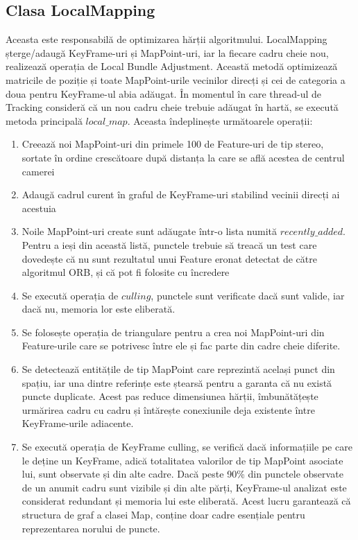\documentclass[12pt,a4paper]{report}
\begin{document}
\subsection{Clasa LocalMapping}
Aceasta este responsabilă de optimizarea hărții algoritmului. LocalMapping șterge/adaugă KeyFrame-uri
și MapPoint-uri, iar la fiecare cadru cheie nou, realizează operația de Local Bundle 
Adjustment. Această metodă optimizează matricile de poziție și toate MapPoint-urile vecinilor 
direcți și cei de categoria a doua pentru KeyFrame-ul abia adăugat. În momentul în care 
thread-ul de Tracking consideră că un nou cadru cheie trebuie adăugat în hartă, se execută
metoda principală $ local\_map $. Aceasta îndeplinește următoarele operații:
\begin{enumerate}
    \item Creează noi MapPoint-uri din primele 100 de Feature-uri de tip stereo, 
sortate în ordine crescătoare după distanța la care se află acestea de centrul camerei  
    \item Adaugă cadrul curent în graful de KeyFrame-uri stabilind vecinii direcți ai
acestuia 
    \item Noile MapPoint-uri create sunt adăugate într-o lista numită $ recently\_added $.
Pentru a ieși din această listă, punctele trebuie să treacă un test care dovedește că 
nu sunt rezultatul unui Feature eronat detectat de către algoritmul ORB, și că pot fi 
folosite cu încredere
    \item Se execută operația de $ culling $, punctele sunt verificate dacă sunt valide, iar
dacă nu, memoria lor este eliberată.
    \item Se folosește operația de triangulare pentru a crea noi MapPoint-uri din 
Feature-urile care se potrivesc între ele și fac parte din cadre cheie diferite.
    \item Se detectează entitățile de tip MapPoint care reprezintă același punct
din spațiu, iar una dintre referințe este ștearsă pentru a garanta că nu există puncte duplicate. 
Acest pas reduce dimensiunea hărții, îmbunătățește urmărirea cadru cu cadru și întărește conexiunile
deja existente între KeyFrame-urile adiacente.    
    \item Se execută operația de KeyFrame culling, se verifică dacă informațiile pe 
care le deține un KeyFrame, adică totalitatea valorilor de tip MapPoint asociate lui, sunt observate
și din alte cadre. Dacă peste 90\% din punctele observate de un anumit cadru sunt vizibile și din 
alte părți, KeyFrame-ul analizat este considerat redundant și memoria lui este eliberată. Acest
lucru garantează că structura de graf a clasei Map, conține doar cadre esențiale pentru reprezentarea
norului de puncte. 
\end{enumerate}
\end{document}

